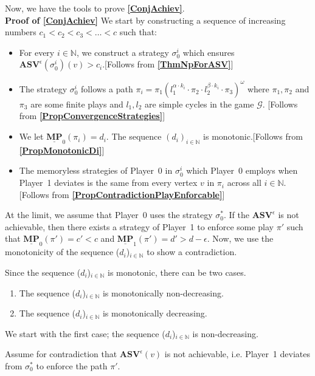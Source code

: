 Now, we have the tools to prove \textbf{\cref{ConjAchiev}}. \\
\noindent \textbf{Proof of \cref{ConjAchiev}} We start by constructing a sequence of increasing numbers $c_1 < c_2 < c_3 < \dotsc < c$ such that:
\begin{itemize}
    \item For every $i \in \mathbb{N}$, we construct a strategy $\sigma_0^i$ which ensures $\mathbf{ASV}^{\epsilon}(\sigma_0^i)(v) > c_i$.[Follows from \textbf{\cref{ThmNpForASV}}]
    \item The strategy $\sigma_0^i$ follows a path $\pi_i = \pi_{1}(l^{\alpha \cdot k_i}_{1} \cdot \pi_{2} \cdot l^{\beta \cdot k_i}_{2} \cdot \pi_{3})^{\omega}$ where $\pi_1, \pi_2$ and $\pi_3$ are some finite plays and $l_1, l_2$ are simple cycles in the game $\mathcal{G}$. [Follows from \textbf{\cref{PropConvergenceStrategies}}]
    \item We let $\underline{\mathbf{MP}}_0(\pi_i) = d_i$. The sequence $(d_i)_{i\in \mathbb{N}}$ is monotonic.[Follows from \textbf{\cref{PropMonotonicDi}}]
    \item The memoryless strategies of Player~0 in $\sigma_0^i$ which Player~0 employs when Player~1 deviates is the same from every vertex $v$ in $\pi_i$ across all $i \in \mathbb{N}$.[Follows from \textbf{\cref{PropContradictionPlayEnforcable}}]
\end{itemize}

At the limit, we assume that Player~0 uses the strategy $\sigma_0^*$. If the $\mathbf{ASV}^{\epsilon}$ is not achievable, then there exists a strategy of Player~1 to enforce some play $\pi'$ such that $\underline{\mathbf{MP}}_0(\pi') = c' < c$ and $\underline{\mathbf{MP}}_1(\pi') = d' > d - \epsilon$. Now, we use the monotonicity of the sequence ($d_i$)$_{i \in \mathbb{N}}$ to show a contradiction. 

Since the sequence ($d_i$)$_{i \in \mathbb{N}}$ is monotonic, there can be two cases.
\begin{enumerate}
    \item The sequence ($d_i$)$_{i \in \mathbb{N}}$ is monotonically non-decreasing.
    \item The sequence ($d_i$)$_{i \in \mathbb{N}}$ is monotonically decreasing.
\end{enumerate}

We start with the first case; the sequence ($d_i$)$_{i \in \mathbb{N}}$ is non-decreasing.

Assume for contradiction that $\mathbf{ASV}^{\epsilon}(v)$ is not achievable, i.e. Player~1 deviates from $\sigma_0^*$ to enforce the path $\pi'$. 


